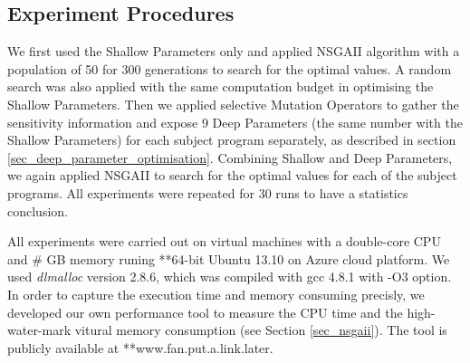 \subsection{Experiment Procedures}

We first used the Shallow Parameters only and applied NSGAII algorithm with a population of 50 for 300 generations to search for the optimal values. A random search was also applied with the same computation budget in optimising the Shallow Parameters. Then we applied selective Mutation Operators to gather the sensitivity information and expose 9 Deep Parameters (the same number with the Shallow Parameters) for each subject program separately, as described in section \ref{sec_deep_parameter_optimisation}. Combining Shallow and Deep Parameters, we again applied NSGAII to search for the optimal values for each of the subject programs. All experiments were repeated for 30 runs to have a statistics conclusion.

All experiments were carried out on virtual machines with a double-core CPU and \# GB memory runing **64-bit Ubuntu 13.10 on Azure cloud platform. We used \emph{dlmalloc} version 2.8.6, which was compiled with gcc 4.8.1 with -O3 option. In order to capture the execution time and memory consuming precisly, we developed our own performance tool to measure the CPU time and the high-water-mark vitural memory consumption (see Section \ref{sec_nsgaii}). The tool is publicly available at **www.fan.put.a.link.later.
